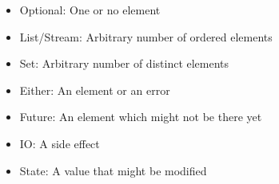 \begin{itemize}[<+->]
  \item Optional: One or no element
  \item List/Stream: Arbitrary number of ordered elements
  \item Set: Arbitrary number of distinct elements
  \item Either: An element or an error
  \item Future: An element which might not be there yet
  \item IO: A side effect
  \item State: A value that might be modified
\end{itemize}
